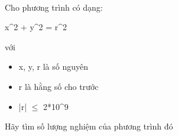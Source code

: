  

Cho phương trình có dạng:

x^2 + y^2 = r^2

với
\begin{itemize}
	\item x, y, r là số nguyên
	\item r là hằng số cho trước
	\item |r|  $\le$  2*10^9
\end{itemize}

Hãy tìm số lượng nghiệm của phương trình đó

\